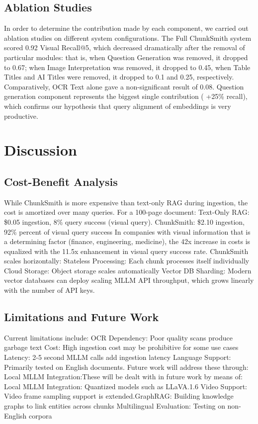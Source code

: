 \documentclass[conference]{IEEEtran}
\begin{document}
\subsection{Ablation Studies}
In order to determine the contribution made by each component, we carried out ablation studies on different system configurations. The Full ChunkSmith system scored 0.92 Visual Recall@5, which decreased dramatically after the removal of particular modules: that is, when Question Generation was removed, it dropped to 0.67; when Image Interpretation was removed, it dropped to 0.45, when Table Titles and AI Titles were removed, it dropped to 0.1 and 0.25, respectively. Comparatively, OCR Text alone gave a non-significant result of 0.08. Question generation component represents the biggest single contribution ( +25\% recall), which confirms our hypothesis that query alignment of embeddings is very productive.
\section{Discussion}
\subsection{Cost-Benefit Analysis}
While ChunkSmith is more expensive than text-only RAG during ingestion, the cost is amortized over many queries. For a 100-page document:
{Text-Only RAG}: \$0.05 ingestion, 8\% query success (visual query).
{ChunkSmith}: \$2.10 ingestion, 92\% percent of visual query success
In companies with visual information that is a determining factor (finance, engineering, medicine), the 42x increase in costs is equalized with the 11.5x enhancement in visual query success rate.
ChunkSmith scales horizontally:
{Stateless Processing}: Each chunk processes itself individually Cloud Storage: Object storage scales automatically Vector DB Sharding: Modern vector databases can deploy scaling MLLM API throughput, which grows linearly with the number of API keys.
\subsection{Limitations and Future Work}
Current limitations include:
{OCR Dependency}: Poor quality scans produce garbage text {Cost}: High ingestion cost may be prohibitive for some use cases {Latency}: 2-5 second MLLM calls add ingestion latency {Language Support}: Primarily tested on English documents. Future work will address these through: {Local MLLM Integration}:These will be dealt with in future work by means of:
Local MLLM Integration: Quantized models such as LLaVA.1.6 Video Support: Video frame sampling support is extended.{GraphRAG}: Building knowledge graphs to link entities across chunks {Multilingual Evaluation}: Testing on non-English corpora
\end{document}
